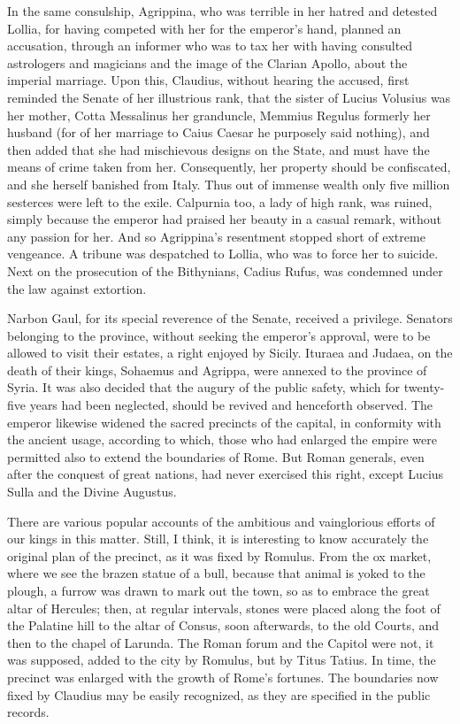 
In the same consulship, Agrippina, who was terrible in her hatred and detested Lollia, for having competed with her for the emperor's hand, planned an accusation, through an informer who was to tax her with having consulted astrologers and magicians and the image of the Clarian Apollo, about the imperial marriage. Upon this, Claudius, without hearing the accused, first reminded the Senate of her illustrious rank, that the sister of Lucius Volusius was her mother, Cotta Messalinus her granduncle, Memmius Regulus formerly her husband (for of her marriage to Caius Caesar he purposely said nothing), and then added that she had mischievous designs on the State, and must have the means of crime taken from her. Consequently, her property should be confiscated, and she herself banished from Italy. Thus out of immense wealth only five million sesterces were left to the exile. Calpurnia too, a lady of high rank, was ruined, simply because the emperor had praised her beauty in a casual remark, without any passion for her. And so Agrippina's resentment stopped short of extreme vengeance. A tribune was despatched to Lollia, who was to force her to suicide. Next on the prosecution of the Bithynians, Cadius Rufus, was condemned under the law against extortion.


Narbon Gaul, for its special reverence of the Senate, received a privilege. Senators belonging to the province, without seeking the emperor's approval, were to be allowed to visit their estates, a right enjoyed by Sicily. Ituraea and Judaea, on the death of their kings, Sohaemus and Agrippa, were annexed to the province of Syria. It was also decided that the augury of the public safety, which for twenty-five years had been neglected, should be revived and henceforth observed. The emperor likewise widened the sacred precincts of the capital, in conformity with the ancient usage, according to which, those who had enlarged the empire were permitted also to extend the boundaries of Rome. But Roman generals, even after the conquest of great nations, had never exercised this right, except Lucius Sulla and the Divine Augustus.


There are various popular accounts of the ambitious and vainglorious efforts of our kings in this matter. Still, I think, it is interesting to know accurately the original plan of the precinct, as it was fixed by Romulus. From the ox market, where we see the brazen statue of a bull, because that animal is yoked to the plough, a furrow was drawn to mark out the town, so as to embrace the great altar of Hercules; then, at regular intervals, stones were placed along the foot of the Palatine hill to the altar of Consus, soon afterwards, to the old Courts, and then to the chapel of Larunda. The Roman forum and the Capitol were not, it was supposed, added to the city by Romulus, but by Titus Tatius. In time, the precinct was enlarged with the growth of Rome's fortunes. The boundaries now fixed by Claudius may be easily recognized, as they are specified in the public records.

